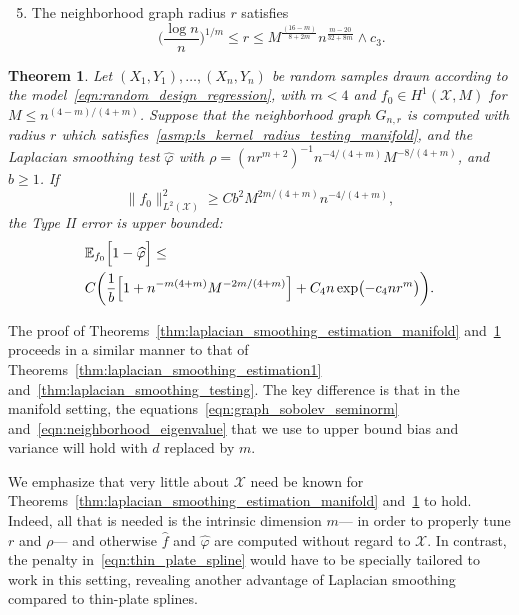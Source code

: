 \documentclass[twoside]{article}
\newcommand{\1}{\mathbf{1}}
\newcommand{\Xset}{\mathcal{X}}
\newcommand{\Leb}{L}
\newcommand{\Ebb}{\mathbb{E}}
\newcommand{\wh}[1]{\widehat{#1}}
\newtheorem{theorem}{Theorem}
\theoremstyle{definition}
\theoremstyle{remark}
\begin{document}
\begin{enumerate}[label=(R\arabic*)]
	\setcounter{enumi}{4}
	\item 
	\label{asmp:ls_kernel_radius_testing_manifold}
	The neighborhood graph radius $r$ satisfies
	\begin{equation*}
	\biggl(\frac{\log n}{n}\biggr)^{1/m} \leq r \leq M^{\frac{(16 - m)}{8 + 2m}}n^{\frac{m - 20}{32 + 8m}} \wedge c_3.
	\end{equation*}
\end{enumerate}

\begin{theorem}
	\label{thm:laplacian_smoothing_testing_manifold}
	Let $(X_1,Y_1),\ldots,(X_n,Y_n)$ be random samples drawn according to the model~\eqref{eqn:random_design_regression}, with $m < 4$ and $f_0 \in H^1(\Xset,M)$ for $M \leq n^{(4 - m)/(4 + m)}$. Suppose that the neighborhood graph $G_{n,r}$ is computed with radius $r$ which satisfies~\ref{asmp:ls_kernel_radius_testing_manifold}, and the Laplacian smoothing test $\wh{\varphi}$ with $\rho = (nr^{m + 2})^{-1} n^{-4/(4 + m)} M^{-8/(4 + m)}$, and $b \geq 1$. If
	\begin{equation}
	\label{eqn:laplacian_smoothing_testing_manifold}
	\bigl\|f_0\bigr\|_{\Leb^2(\Xset)}^2 \geq C b^2 M^{2m/(4 + m)} n^{-4/(4 + m)},
	\end{equation} 
	the Type II error is upper bounded:
	\begin{align*}
	& \Ebb_{f_0}\Bigl[1 - \wh{\varphi} \Bigr] \leq \\
	& C\biggl(\frac{1}{b}\Bigl[1 + n^{-m(4 + m)}M^{-2m/(4 + m)}\Bigr] + C_4n\exp\bigl(-c_4nr^m\bigr)\biggr).
	\end{align*}
\end{theorem}
The proof of Theorems~\ref{thm:laplacian_smoothing_estimation_manifold} and~\ref{thm:laplacian_smoothing_testing_manifold} proceeds in a similar manner to that of Theorems~\ref{thm:laplacian_smoothing_estimation1} and~\ref{thm:laplacian_smoothing_testing}. The key difference is that in the manifold setting, the equations~\eqref{eqn:graph_sobolev_seminorm} and~\eqref{eqn:neighborhood_eigenvalue} that we use to upper bound bias and variance will hold with $d$ replaced by $m$.

We emphasize that very little about $\Xset$ need be known for Theorems~\ref{thm:laplacian_smoothing_estimation_manifold} and~\ref{thm:laplacian_smoothing_testing_manifold} to hold. Indeed, all that is needed is the intrinsic dimension $m$--- in order to properly tune $r$ and $\rho$--- and otherwise $\wh{f}$ and $\wh{\varphi}$ are computed without regard to $\Xset$. In contrast, the penalty in~\eqref{eqn:thin_plate_spline} would have to be specially tailored to work in this setting, revealing another advantage of Laplacian smoothing compared to thin-plate splines.
\end{document}
